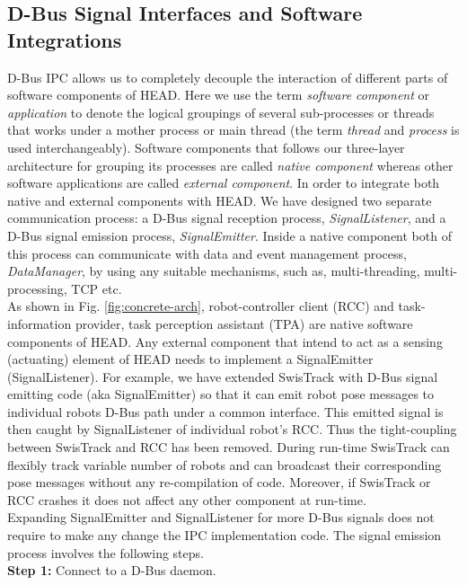 \documentclass{ifacconf}
\begin{document}
\subsection{D-Bus Signal Interfaces and Software Integrations}
D-Bus IPC allows us to completely decouple the interaction of different parts of software components of HEAD. Here we use the term {\em software component} or {\em application} to denote the logical groupings of several sub-processes or threads that works under a mother process or main thread (the term {\em thread} and {\em process} is used interchangeably). Software components that follows our three-layer architecture for grouping its processes are called {\em native component} whereas other software applications are called {\em external component}. In order to integrate both native and external components with HEAD. We have designed two separate communication process: a D-Bus signal reception process, {\em SignalListener}, and a D-Bus signal emission process, {\em SignalEmitter}. Inside a native component both of this process can communicate with data and event management process, {\em DataManager}, by using any suitable mechanisms, such as, multi-threading, multi-processing, TCP etc.\\
 As shown in Fig. \ref{fig:concrete-arch}, robot-controller client (RCC) and task-information provider, task perception assistant (TPA) are native software components of HEAD. Any external component that intend to act as a sensing (actuating) element of HEAD needs to implement a SignalEmitter (SignalListener). For example, we have extended SwisTrack  \citep{Lochmatter+2008} with D-Bus signal emitting code (aka SignalEmitter) so that it can emit robot pose messages to individual robots D-Bus path under a common interface. This emitted signal is then caught by SignalListener of individual robot's RCC. Thus the tight-coupling between SwisTrack and RCC has been removed. During run-time SwisTrack can flexibly track variable number of robots and can broadcast their corresponding pose messages without any re-compilation of code. Moreover, if SwisTrack or RCC crashes it does not affect any other component at run-time.\\
Expanding SignalEmitter and SignalListener for more D-Bus signals does not require to make any change the IPC implementation code. The signal emission process involves the following steps.\\
\textbf{Step 1:} Connect to a D-Bus daemon. \\
\end{document}
